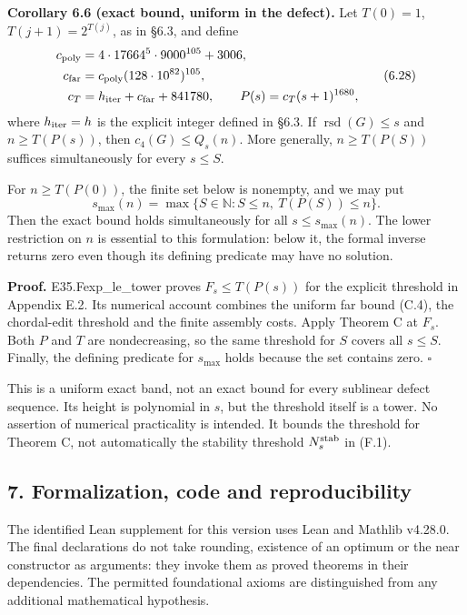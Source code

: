 \documentclass[english,11pt,a4paper]{article}
\newcounter{none}
\begin{document}

\textbf{Corollary 6.6 (exact bound, uniform in the defect).} Let \(T(0)=1\), \(T(j+1)=2^{T(j)}\), as in §6.3, and define \[
\begin{aligned}
c_{\rm poly}&=4\cdot17664^5\cdot9000^{105}+3006,\\
c_{\rm far}&=c_{\rm poly}(128\cdot10^{82})^{105},\\
c_T&=h_{\rm iter}+c_{\rm far}+841780,\qquad
P(s)=c_T(s+1)^{1680},
\end{aligned}
\tag{6.28}
\] where \(h_{\rm iter}=h\) is the explicit integer defined in §6.3. If \(\operatorname{rsd}(G)\le s\) and \(n\ge T(P(s))\), then \(c_4(G)\le Q_s(n)\). More generally, \(n\ge T(P(S))\) suffices simultaneously for every \(s\le S\).

For \(n\ge T(P(0))\), the finite set below is nonempty, and we may put \[
s_{\max}(n)=\max\{S\in\mathbb N:S\le n,\ T(P(S))\le n\}.
\tag{6.29}
\] Then the exact bound holds simultaneously for all \(s\le s_{\max}(n)\). The lower restriction on \(n\) is essential to this formulation: below it, the formal inverse returns zero even though its defining predicate may have no solution.

\textbf{Proof.} {\ttfamily\small E35.\discretionary{\hbox{\ensuremath{\hookrightarrow}}}{}{}Fexp\_\discretionary{\hbox{\ensuremath{\hookrightarrow}}}{}{}le\_\discretionary{\hbox{\ensuremath{\hookrightarrow}}}{}{}tower} proves \(F_s\le T(P(s))\) for the explicit threshold in Appendix E.2. Its numerical account combines the uniform far bound (C.4), the chordal-edit threshold and the finite assembly costs. Apply Theorem C at \(F_s\). Both \(P\) and \(T\) are nondecreasing, so the same threshold for \(S\) covers all \(s\le S\). Finally, the defining predicate for \(s_{\max}\) holds because the set contains zero. \(\square\)

This is a uniform exact band, not an exact bound for every sublinear defect sequence. Its height is polynomial in \(s\), but the threshold itself is a tower. No assertion of numerical practicality is intended. It bounds the threshold for Theorem C, not automatically the stability threshold \(N_s^{\rm stab}\) in (F.1).

\subsection{7. Formalization, code and reproducibility}\label{formalization-code-and-reproducibility}

The identified Lean supplement for this version uses Lean and Mathlib v4.28.0. The final declarations do not take rounding, existence of an optimum or the near constructor as arguments: they invoke them as proved theorems in their dependencies. The permitted foundational axioms are distinguished from any additional mathematical hypothesis.
\end{document}
